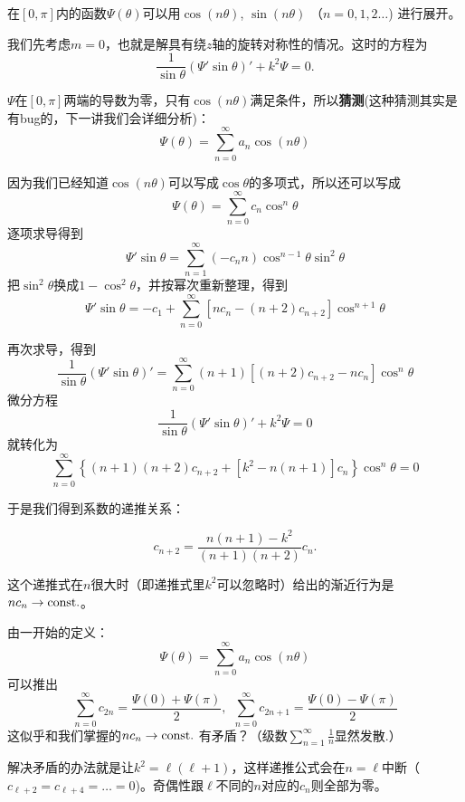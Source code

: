 \documentclass[CJK]{beamer}
\begin{document}
\begin{frame}
\bch
在$[0,\pi]$内的函数$\Psi(\theta)$可以用$\cos{(n\theta)}$, $\sin{(n\theta)}$ （$n=0,1,2\ldots$) 进行展开。

  \skiplines

我们先考虑$m=0$，也就是解具有绕$z$轴的旋转对称性的情况。这时的方程为
$$ \frac{1}{\sin\theta}(\Psi'\sin\theta)' + k^2 \Psi = 0. $$


$\Psi$在$[0,\pi]$两端的导数为零，只有$\cos{(n\theta)}$满足条件，所以{\bf 猜测}(这种猜测其实是有bug的，下一讲我们会详细分析)：
$$\Psi(\theta) = \sum_{n=0}^\infty a_n\cos{(n\theta)} $$
\ech
\end{frame}



\begin{frame}
\bch
因为我们已经知道$\cos{(n\theta)}$可以写成$\cos\theta$的多项式，所以还可以写成
$$\Psi(\theta) = \sum_{n=0}^\infty c_n\cos^n\theta $$
逐项求导得到
$$\Psi' \sin\theta  = \sum_{n=1}^\infty (-c_nn) \cos^{n-1}\theta\sin^2\theta $$
把$\sin^2\theta$换成$1-\cos^2\theta$，并按幂次重新整理，得到
$$\Psi' \sin\theta  = - c_1+ \sum_{n=0}^\infty \left[nc_n-(n+2)c_{n+2}\right] \cos^{n+1}\theta $$


\ech
\end{frame}


\begin{frame}
\bch
再次求导，得到
$$\frac{1}{\sin\theta}\left(\Psi' \sin\theta\right)'  = \sum_{n=0}^\infty (n+1)\left[(n+2)c_{n+2}-nc_n\right] \cos^n\theta $$
微分方程
$$\frac{1}{\sin\theta}\left(\Psi' \sin\theta\right)'+k^2\Psi = 0$$
就转化为
$$ \sum_{n=0}^\infty \left\{(n+1)(n+2)c_{n+2}+\left[k^2-n(n+1)\right]c_n\right\} \cos^n\theta  = 0 $$
\ech
\end{frame}


\begin{frame}
\bch
于是我们得到系数的递推关系：

$$ c_{n+2} = \frac{n(n+1)-k^2}{(n+1)(n+2)} c_n. $$

这个递推式在$n$很大时（即递推式里$k^2$可以忽略时）给出的渐近行为是$nc_n \rightarrow \mathrm{const.}$。

\ech
\end{frame}



\begin{frame}
\bch
由一开始的定义：
$$\Psi(\theta) = \sum_{n=0}^\infty a_n\cos{(n\theta)} $$
可以推出
$$ \sum_{n=0}^\infty c_{2n} = \frac{\Psi(0)+\Psi(\pi)}{2},\ \ \sum_{n=0}^\infty c_{2n+1} = \frac{\Psi(0)-\Psi(\pi)}{2} $$
这似乎和我们掌握的$nc_n\rightarrow \mathrm{const.}$ 有矛盾？（级数$\sum_{n=1}^\infty\frac{1}{n}$显然发散.）

\skiplines

解决矛盾的办法就是让$k^2 = \ell(\ell+1)$，这样递推公式会在$n=\ell$中断（$c_{\ell+2}=c_{\ell+4}=\ldots = 0$)。奇偶性跟$\ell$不同的$n$对应的$c_n$则全部为零。


\ech
\end{frame}
\end{document}
